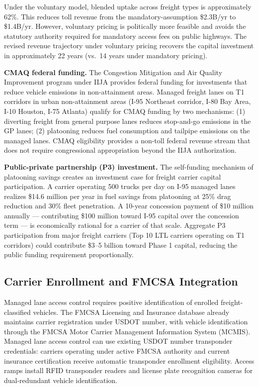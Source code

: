 Under the voluntary model, blended uptake across freight types is approximately
62\%. This reduces toll revenue from the mandatory-assumption \$2.3B/yr to
\$1.4B/yr. However, voluntary pricing is politically more feasible and avoids
the statutory authority required for mandatory access fees on public highways.
The revised revenue trajectory under voluntary pricing recovers the capital
investment in approximately 22 years (vs.\ 14 years under mandatory pricing).

\textbf{CMAQ federal funding.} The Congestion Mitigation and Air Quality Improvement program under IIJA \citep{IIJA2021} provides federal funding for investments that reduce vehicle emissions in non-attainment areas. Managed freight lanes on T1 corridors in urban non-attainment areas (I-95 Northeast corridor, I-80 Bay Area, I-10 Houston, I-75 Atlanta) qualify for CMAQ funding by two mechanisms: (1) diverting freight from general purpose lanes reduces stop-and-go emissions in the GP lanes; (2) platooning reduces fuel consumption and tailpipe emissions on the managed lanes. CMAQ eligibility provides a non-toll federal revenue stream that does not require congressional appropriation beyond the IIJA authorization.

\textbf{Public-private partnership (P3) investment.} The self-funding mechanism of platooning savings creates an investment case for freight carrier capital participation. A carrier operating 500 trucks per day on I-95 managed lanes realizes \$14.6 million per year in fuel savings from platooning at 25\% drag reduction and 30\% fleet penetration. A 10-year concession payment of \$10 million annually --- contributing \$100 million toward I-95 capital over the concession term --- is economically rational for a carrier of that scale. Aggregate P3 participation from major freight carriers (Top 10 LTL carriers operating on T1 corridors) could contribute \$3--5 billion toward Phase 1 capital, reducing the public funding requirement proportionally.

\subsection{Carrier Enrollment and FMCSA Integration}

Managed lane access control requires positive identification of enrolled freight-classified vehicles. The FMCSA Licensing and Insurance database already maintains carrier registration under USDOT number, with vehicle identification through the FMCSA Motor Carrier Management Information System (MCMIS). Managed lane access control can use existing USDOT number transponder credentials: carriers operating under active FMCSA authority and current insurance certification receive automatic transponder enrollment eligibility. Access ramps install RFID transponder readers and license plate recognition cameras for dual-redundant vehicle identification.

